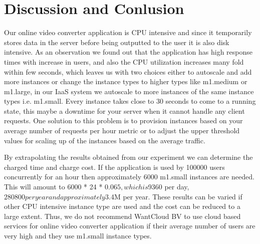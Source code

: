 \section{Discussion and Conlusion}
Our online video converter application is CPU intensive and since it temporarily stores data in the server before being outputted to the user it is also disk intensive. 
As an observation we found out that the application has high response times with increase in users, and also the CPU utilization increases many fold within few seconds, which leaves us with two choices either to autoscale and add more instances or change the instance types to higher types like m1.medium or m1.large, in our IaaS system we autoscale to more instances of the same instance types i.e. m1.small. 
Every instance takes close to 30 seconds to come to a running state, this maybe a downtime for your server when it cannot handle any client requests. 
One solution to this problem is to provision instances based on your average number of requests per hour metric or to adjust the upper threshold values for scaling up of the instances based on the average traffic.


By extrapolating the results obtained from our experiment we can determine the charged time and charge cost.
If the application is used by 100000 users concurrently for an hour then approximately 6000 m1.small instances are needed.
This will amount to 6000 * 24 * $0.065, which is $9360 per day, $280800 per year and approximately $3.4M per year.
These results can be varied if other CPU intensive instance type are used and the cost can be reduced to a large extent.
Thus, we do not recommend WantCloud BV to use cloud based services for online video converter application if their average number of users are very high and they use m1.small instance types.
\label{sec:disc}